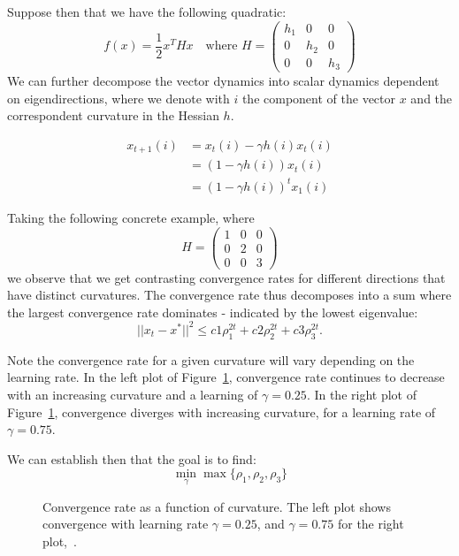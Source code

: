 \documentclass{article}
\begin{document}
Suppose then that we have the following quadratic:
\begin{equation}
f(x) = \frac{1}{2} x^T H x \quad \text{where } H = \begin{pmatrix} h_1&0&0\\0&h_2&0\\0&0&h_3\end{pmatrix}
\end{equation}
We can further decompose the vector dynamics into scalar dynamics dependent on eigendirections, where we denote with $i$ the component of the vector $x$ and the correspondent curvature in the Hessian $h$. 

\begin{align*}
	x_{t+1}(i) &= x_t(i) -\gamma h(i) x_t(i) \\
            &=(1 - \gamma h(i)) x_t(i) \\
            &=(1 - \gamma h(i))^t x_1(i)
\end{align*}

Taking the following concrete example, where 
\begin{equation}
H = \begin{pmatrix} 1&0&0\\0&2&0\\0&0&3\end{pmatrix}
\end{equation}
we observe that we get contrasting convergence rates for different directions that have distinct curvatures. The convergence rate thus decomposes into a sum where the largest convergence rate dominates - indicated by the lowest eigenvalue:
\begin{equation}
||x_t - x^*||^2 \leq c1 \rho_1^{2t} + c2 \rho_2^{2t} + c3 \rho_3^{2t}.
\end{equation}

Note the convergence rate for a given curvature will vary depending on the learning rate. In the left plot of Figure~\ref{fig:multivar_conv}, convergence rate continues to decrease with an increasing curvature and a learning of $\gamma = 0.25$. In the right plot of Figure~\ref{fig:multivar_conv}, convergence diverges with increasing curvature, for a learning rate of $\gamma=0.75$.

We can establish then that the goal is to find:
\begin{equation}
\min_\gamma \max \{\rho_1, \rho_2, \rho_3\}
\end{equation}

\begin{figure}[H]%
\centering
{}%
\qquad
{}%
\caption{Convergence rate as a function of curvature. The left plot shows convergence with learning rate $\gamma = 0.25$, and $\gamma = 0.75$ for the right plot,~\cite{mitliagkas2019interesting}.}
\label{fig:multivar_conv}
\end{figure}
\end{document}
